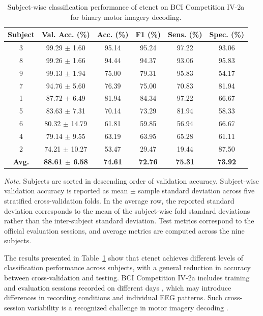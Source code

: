 \begin{table}[htbp]
\centering
\caption{Subject-wise classification performance of \gls{ctenet}
on BCI Competition IV-2a for binary motor imagery decoding.}
\label{tab:cte_bci2a_performance}
\small
\begin{tabular}{cccccc}
\hline
\textbf{Subject} &
\textbf{Val. Acc. (\%)} &
\textbf{Acc. (\%)} &
\textbf{F1 (\%)} &
\textbf{Sens. (\%)} &
\textbf{Spec. (\%)} \\
\hline
3 & 99.29 $\pm$ 1.60 & 95.14 & 95.24 & 97.22 & 93.06 \\
8 & 99.26 $\pm$ 1.66 & 94.44 & 94.37 & 93.06 & 95.83 \\
9 & 99.13 $\pm$ 1.94 & 75.00 & 79.31 & 95.83 & 54.17 \\
7 & 94.76 $\pm$ 5.60 & 76.39 & 75.00 & 70.83 & 81.94 \\
1 & 87.72 $\pm$ 6.49 & 81.94 & 84.34 & 97.22 & 66.67 \\
5 & 83.63 $\pm$ 7.31 & 70.14 & 73.29 & 81.94 & 58.33 \\
6 & 80.32 $\pm$ 14.79 & 61.81 & 59.85 & 56.94 & 66.67 \\
4 & 79.14 $\pm$ 9.55 & 63.19 & 63.95 & 65.28 & 61.11 \\
2 & 74.21 $\pm$ 10.27 & 53.47 & 29.47 & 19.44 & 87.50 \\
\hline
\textbf{Avg.} &
\textbf{88.61 $\pm$ 6.58} &
\textbf{74.61} &
\textbf{72.76} &
\textbf{75.31} &
\textbf{73.92} \\
\hline
\end{tabular}

\vspace{2mm}

\parbox{0.95\linewidth}{
\footnotesize
\textit{Note.} Subjects are sorted in descending order of validation accuracy. Subject-wise validation accuracy is reported as mean $\pm$ sample standard deviation across five stratified cross-validation folds. In the average row, the reported standard deviation corresponds to the mean of the subject-wise fold standard deviations rather than the inter-subject standard deviation. Test metrics correspond to the official evaluation sessions, and average metrics are computed across the nine subjects.}
\end{table}

The results presented in Table~\ref{tab:cte_bci2a_performance} show that \gls{ctenet} achieves different levels of classification performance across subjects, with a general reduction in accuracy between cross-validation and testing. BCI Competition IV-2a includes training and evaluation sessions recorded on different days \cite{brunner2008graz}, which may introduce differences in recording conditions and individual EEG patterns. Such cross-session variability is a recognized challenge in motor imagery decoding \cite{ma2022crosssession}.

